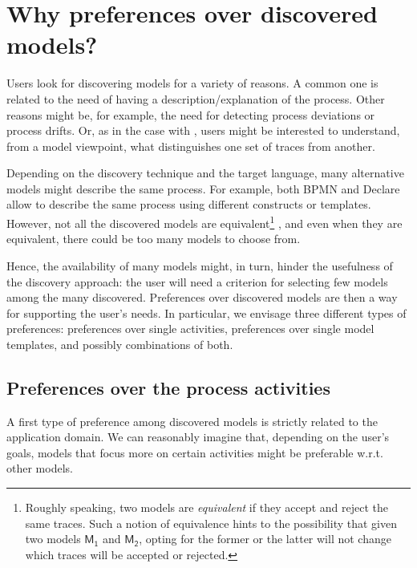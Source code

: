 
\section{Why preferences over discovered models?}
\label{sec:example}


Users look for discovering models for a variety of reasons. A common one is related to the need of having a description/explanation of the process. Other reasons might be, for example, the need for detecting process deviations or process drifts. Or, as in the case with \nd, users might be interested to understand, from a model viewpoint, what distinguishes one set of traces from another. 

Depending on the discovery technique and the target language, many alternative models might describe the same process. For example, both BPMN and Declare allow to describe the same process using different constructs or templates. However, not all the discovered models are equivalent\footnote{Roughly speaking, two models are \emph{equivalent} if they accept and reject the same traces. Such a notion of equivalence hints to the possibility that given two models $\mathsf{M_1}$ and $\mathsf{M_2}$, opting for the former or the latter will not change which traces will be accepted or rejected.}
, and even when they are equivalent, there could be too many models to choose from.

Hence, the availability of many models might, in turn, hinder the usefulness of the discovery approach: the user will need a criterion for selecting few models among the many discovered.
%
Preferences over discovered models are then a way for supporting the user's needs. In particular, we envisage three different types of preferences: preferences over single activities, preferences over single model templates, and possibly combinations of both.



\subsection{Preferences over the process activities}
\label{subsec:prefOverActivities}

A first type of preference among discovered models is strictly related to the application domain. We can reasonably imagine that, depending on the user's goals, models that focus more on certain activities might be preferable w.r.t. other models.

